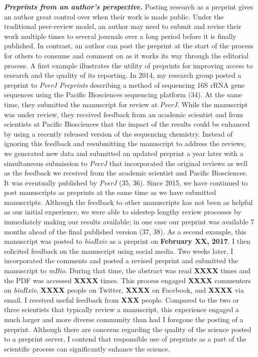 \documentclass[11pt,]{article}
\begin{document}
\textbf{\emph{Preprints from an author's perspective.}} Posting research
as a preprint gives an author great control over when their work is made
public. Under the traditional peer-review model, an author may need to
submit and revise their work multiple times to several journals over a
long period before it is finally published. In contrast, an author can
post the preprint at the start of the process for others to consume and
comment on as it works its way through the editorial process. A first
example illustrates the utility of preprints for improving access to
research and the quality of its reporting. In 2014, my research group
posted a preprint to \emph{PeerJ Preprints} describing a method of
sequencing 16S rRNA gene sequences using the Pacific Biosciences
sequencing platform (34). At the same time, they submitted the
manuscript for review at \emph{PeerJ}. While the manuscript was under
review, they received feedback from an academic scientist and from
scientists at Pacific Biosciences that the impact of the results could
be enhanced by using a recently released version of the sequencing
chemistry. Instead of ignoring this feedback and resubmitting the
manuscript to address the reviews, we generated new data and submitted
an updated preprint a year later with a simultaneous submission to
\emph{PeerJ} that incorporated the original reviews as well as the
feedback we received from the academic scientist and Pacific
Biosciences. It was eventually published by \emph{PeerJ} (35, 36). Since
2015, we have continued to post manuscripts as preprints at the same
time as we have submitted manuscripts. Although the feedback to other
manuscripts has not been as helpful as our initial experience, we were
able to sidestep lengthy review processes by immediately making our
results available; in one case our preprint was available 7 months ahead
of the final published version (37, 38). As a second example, this
manuscript was posted to \emph{bioRxiv} as a preprint on
\textbf{February XX, 2017}. I then solicited feedback on the manuscript
using social media. Two weeks later, I incorporated the comments and
posted a revised preprint and submitted the manuscript to \emph{mBio}.
During that time, the abstract was read \textbf{XXXX} times and the PDF
was accessed \textbf{XXXX} times. This process engaged \textbf{XXXX}
commenters on \emph{bioRxiv}, \textbf{XXXX} people on Twitter,
\textbf{XXXX} on Facebook, and \textbf{XXXX} via email. I received
useful feedback from \textbf{XXX} people. Compared to the two or three
scientists that typically review a manuscript, this experience engaged a
much larger and more diverse community than had I foregone the posting
of a preprint. Although there are concerns regarding the quality of the
science posted to a preprint server, I contend that responsible use of
preprints as a part of the scientific process can significantly enhance
the science.
\end{document}
